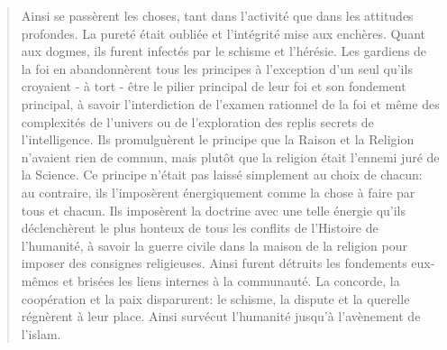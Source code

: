 \begin{quote}
Ainsi se passèrent les choses, tant dans l'activité que dans les
attitudes profondes. La pureté était oubliée et l'intégrité mise aux
enchères. Quant aux dogmes, ils furent infectés par le schisme et
l'hérésie. Les gardiens de la foi en abandonnèrent tous les principes à
l'exception d'un seul qu'ils croyaient - à tort - être le pilier
principal de leur foi et son fondement principal, à savoir
l'interdiction de l'examen rationnel de la foi et même des complexités
de l'univers ou de l'exploration des replis secrets de l'intelligence.
Ils promulguèrent le principe que la Raison et la Religion n'avaient
rien de commun, mais plutôt que la religion était l'ennemi juré de la
Science. Ce principe n'était pas laissé simplement au choix de chacun:
au contraire, ils l'imposèrent énergiquement comme la chose à faire par
tous et chacun. Ils imposèrent la doctrine avec une telle énergie qu'ils
déclenchèrent le plus honteux de tous les conflits de l'Histoire de
l'humanité, à savoir la guerre civile dans la maison de la religion pour
imposer des consignes religieuses. Ainsi furent détruits les fondements
eux-mêmes et brisées les liens internes à la communauté. La concorde, la
coopération et la paix disparurent: le schisme, la dispute et la
querelle régnèrent à leur place. Ainsi survécut l'humanité jusqu'à
l'avènement de l'islam.


\end{quote}
